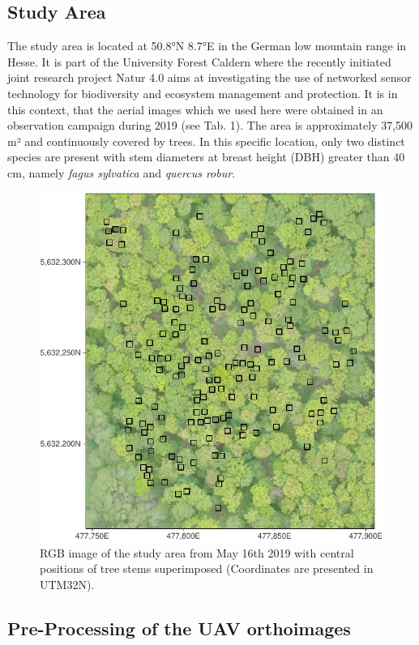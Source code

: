 \documentclass[]{article}
\begin{document}
\hypertarget{study-area}{%
\subsection{Study Area}\label{study-area}}

The study area is located at 50.8°N 8.7°E in the German low mountain
range in Hesse. It is part of the University Forest Caldern where the
recently initiated joint research project Natur 4.0 aims at
investigating the use of networked sensor technology for biodiversity
and ecosystem management and protection. It is in this context, that the
aerial images which we used here were obtained in an observation
campaign during 2019 (see Tab. 1). The area is approximately 37,500 m²
and continuously covered by trees. In this specific location, only two
distinct species are present with stem diameters at breast height (DBH)
greater than 40 cm, namely \emph{fagus sylvatica} and \emph{quercus
robur}.

\begin{figure}[H]

{\centering \includegraphics[width=0.7\linewidth]{report_files/figure-latex/plot_aoi-1} 

}

\caption{RGB image of the study area from May 16th 2019 with central positions of tree stems superimposed (Coordinates are presented in UTM32N).}\label{fig:plot_aoi}
\end{figure}

\hypertarget{pre-processing-of-the-uav-orthoimages}{%
\subsection{Pre-Processing of the UAV
orthoimages}\label{pre-processing-of-the-uav-orthoimages}}
\end{document}
